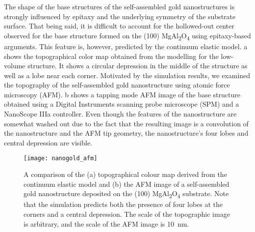 The shape of the base structures of the self-assembled gold nanostructures is strongly influenced by epitaxy and the underlying symmetry of the substrate surface.
That being said, it is difficult to account for the hollowed-out center observed for the base structure formed on the (100) MgAl\textsubscript{2}O\textsubscript{4} using epitaxy-based arguments.
This feature is, however, predicted by the continuum elastic model.
a shows the topographical color map obtained from the modelling for the low-volume structure.
It shows a circular depression in the middle of the structure as well as a lobe near each corner.
Motivated by the simulation results, we examined the topography of the self-assembled gold nanostructure using atomic force microscopy (AFM).
b shows a tapping mode AFM image of the base structure obtained using a Digital Instruments scanning probe microscope (SPM) and a NanoScope IIIa controller.
Even though the features of the nanostructure are somewhat washed out due to the fact that the resulting image is a convolution of the nanostructure and the AFM tip geometry, the nanostructure's four lobes and central depression are visible.
\begin{figure}
 \centering \texttt{[image: nanogold\_afm]}
 \caption[Comparison of AFM and simulated gold nanostructure topography]{\label{fig:nanogold_afm}A comparison of the (a) topographical colour map derived from the continuum elastic model and (b) the AFM image of a self-assembled gold nanostructure deposited on the (100) MgAl\textsubscript{2}O\textsubscript{4} substrate.
  Note that the simulation predicts both the presence of four lobes at the corners and a central depression.
  The scale of the topographic image is arbitrary, and the scale of the AFM image is 10~nm.}
\end{figure}


